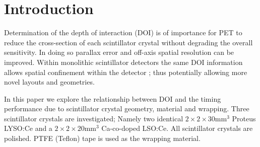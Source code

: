 \section{Introduction} 
Determination of the depth of interaction (DOI) is of importance for PET to reduce the cross-section of each scintillator crystal without degrading the overall sensitivity\cite{Moses_2001}\cite{Humm_Rosenfeld_Del_Guerra_2003}. In doing so parallax error and off-axis spatial resolution can be improved. Within monolithic scintillator detectors the same DOI information allows spatial confinement within the detector \cite{am_Borghi_Seifert_Schaart_2013}\cite{Maas_Bruyndonckx_Schaart_2012}; thus potentially allowing more novel\cite{Dendooven_Lohner_Beekman_2009}\cite{n_der_Lei_van_Dam_Schaart_2013} layouts and geometries.

In this paper we explore the relationship between DOI and the timing performance due to scintillator crystal geometry, material and wrapping. Three scintillator crystals are investigated; Namely two identical $2\times2\times30$mm$^3$ Proteus LYSO:Ce and a $2\times2\times20$mm$^3$ Ca-co-doped LSO:Ce. All scintillator crystals are polished. PTFE (Teflon) tape is used as the wrapping material.
